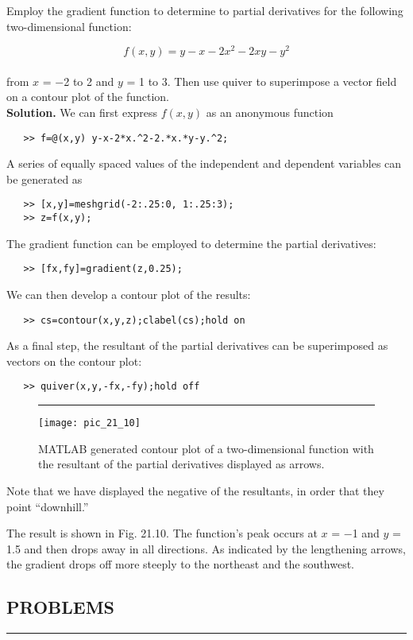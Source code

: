 \documentclass[../main.tex]{subfiles}
\begin{document}
Employ the gradient function to determine to partial derivatives for the following
two-dimensional function:

	$$f(x,y) = y-x-2x^{2} - 2xy - y^{2}$$\\
from $x$ = −2 to 2 and $y$ = 1 to 3. Then use quiver to superimpose a vector field on a contour plot of the function.\\
\textbf{Solution.} We can first express $f(x, y)$ as an anonymous function
\begin{verbatim}
   >> f=@(x,y) y-x-2*x.^2-2.*x.*y-y.^2;
\end{verbatim}
A series of equally spaced values of the independent and dependent variables can be generated as
\begin{verbatim}
   >> [x,y]=meshgrid(-2:.25:0, 1:.25:3);
   >> z=f(x,y);
\end{verbatim}
The gradient function can be employed to determine the partial derivatives:
\begin{verbatim}
   >> [fx,fy]=gradient(z,0.25);
\end{verbatim}
We can then develop a contour plot of the results:
\begin{verbatim}
   >> cs=contour(x,y,z);clabel(cs);hold on
\end{verbatim}
As a final step, the resultant of the partial derivatives can be superimposed as vectors on the
contour plot:
\begin{verbatim}
   >> quiver(x,y,-fx,-fy);hold off
\end{verbatim}

\begin{figure}[hbt!]
	\caption{\textsf{MATLAB generated contour plot of a two-dimensional function with the resultant of the partial
derivatives displayed as arrows.}} \hrule \vspace{0.2in}
\centering
	\texttt{[image: pic\_21\_10]}
	\label{pic.21.10}
\end{figure}
Note that we have displayed the negative of the resultants, in order that they point 
“downhill.”

The result is shown in Fig. 21.10. The function's peak occurs at $x$ = −1 and $y$ = 1.5
and then drops away in all directions. As indicated by the lengthening arrows, the gradient
drops off more steeply to the northeast and the southwest.

\subsection*{PROBLEMS} \hrule
\end{document}
